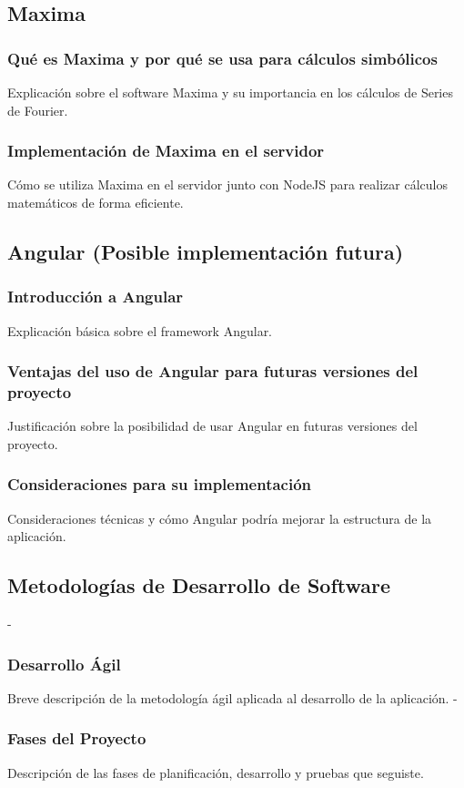 \subsection{Maxima}
\subsubsection{Qué es Maxima y por qué se usa para cálculos simbólicos}
Explicación sobre el software Maxima y su importancia en los cálculos de Series de Fourier.
\subsubsection{Implementación de Maxima en el servidor}
Cómo se utiliza Maxima en el servidor junto con NodeJS para realizar cálculos matemáticos de forma eficiente.

\subsection{Angular (Posible implementación futura)}
\subsubsection{Introducción a Angular}
Explicación básica sobre el framework Angular.
\subsubsection{Ventajas del uso de Angular para futuras versiones del proyecto}
Justificación sobre la posibilidad de usar Angular en futuras versiones del proyecto.
\subsubsection{Consideraciones para su implementación}
Consideraciones técnicas y cómo Angular podría mejorar la estructura de la aplicación.

\subsection{Metodologías de Desarrollo de Software}
- \subsubsection{Desarrollo Ágil}
Breve descripción de la metodología ágil aplicada al desarrollo de la aplicación.
- \subsubsection{Fases del Proyecto}
Descripción de las fases de planificación, desarrollo y pruebas que seguiste.
